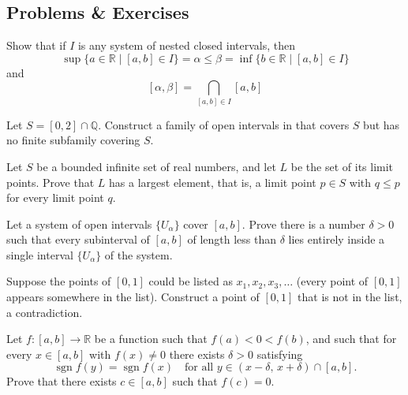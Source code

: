 \newpage
\subsection{Problems \& Exercises}

\begin{problem}
Show that if $I$ is any system of nested closed intervals, then
$$
\sup\{a \in \mathbb{R} \mid [a,b] \in I\} = \alpha \le \beta = \inf\{b \in \mathbb{R} \mid [a,b] \in I\}
$$
and
$$
[\alpha, \beta] = \bigcap_{[a,b] \in I} [a,b]
$$
\end{problem}


\begin{problem}
Let $S = \left[ 0, 2 \right] \cap \mathbb{Q}$. Construct a family of open intervals in  that covers $S$ but has no finite subfamily covering $S$.
\end{problem}

\begin{problem}
Let $S$ be a bounded infinite set of real numbers, and let $L$ be the set of its limit points. Prove that $L$ has a largest element, that is, a limit point $p \in S$ with $q \leq p$ for every limit point $q$.
\end{problem}

\begin{problem}
Let a system of open intervals $\{U_\alpha \}$ cover $[a, b]$. Prove there is a number $\delta > 0$ such that every subinterval of $[a, b]$ of length less than $\delta$ lies entirely inside a single interval $\{U_\alpha \}$ of the system.
\end{problem}

\begin{problem}
Suppose the points of $[0, 1]$ could be listed as $x_1, x_2, x_3, \dots$ (every point of $[0, 1]$ appears somewhere in the list). Construct a point of $[0, 1]$ that is not in the list, a contradiction.
\end{problem}

\begin{problem}
Let $f \colon [a,b] \to \mathbb{R}$ be a function such that $f(a) < 0 < f(b)$, and such that for every $x \in [a,b]$ with $f(x) \neq 0$ there exists $\delta > 0$ satisfying
\[
\operatorname{sgn} f(y) = \operatorname{sgn} f(x) \quad \text{for all } y \in (x - \delta,\, x + \delta) \cap [a,b].
\]
Prove that there exists $c \in [a,b]$ such that $f(c) = 0$.
\end{problem}
